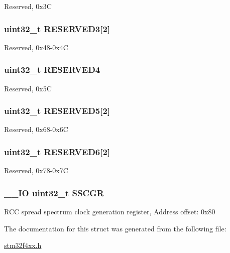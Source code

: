 Reserved, 0x3\-C \hypertarget{struct_r_c_c___type_def_ab6f0f833dbe064708de75d95c68c32fd}{
\subsubsection[{R\-E\-S\-E\-R\-V\-E\-D3}]{\setlength{\rightskip}{0pt plus 5cm}uint32\-\_\-t R\-E\-S\-E\-R\-V\-E\-D3\mbox{[}2\mbox{]}}}\label{struct_r_c_c___type_def_ab6f0f833dbe064708de75d95c68c32fd}
Reserved, 0x48-\/0x4\-C \hypertarget{struct_r_c_c___type_def_ac0018930ee9f18afda25b695b9a4ec16}{
\subsubsection[{R\-E\-S\-E\-R\-V\-E\-D4}]{\setlength{\rightskip}{0pt plus 5cm}uint32\-\_\-t R\-E\-S\-E\-R\-V\-E\-D4}}\label{struct_r_c_c___type_def_ac0018930ee9f18afda25b695b9a4ec16}
Reserved, 0x5\-C \hypertarget{struct_r_c_c___type_def_ac0eb05794aeee3b4ed69c8fe54c9be3b}{
\subsubsection[{R\-E\-S\-E\-R\-V\-E\-D5}]{\setlength{\rightskip}{0pt plus 5cm}uint32\-\_\-t R\-E\-S\-E\-R\-V\-E\-D5\mbox{[}2\mbox{]}}}\label{struct_r_c_c___type_def_ac0eb05794aeee3b4ed69c8fe54c9be3b}
Reserved, 0x68-\/0x6\-C \hypertarget{struct_r_c_c___type_def_a10da398d74a1f88d5b42bd40718d9447}{
\subsubsection[{R\-E\-S\-E\-R\-V\-E\-D6}]{\setlength{\rightskip}{0pt plus 5cm}uint32\-\_\-t R\-E\-S\-E\-R\-V\-E\-D6\mbox{[}2\mbox{]}}}\label{struct_r_c_c___type_def_a10da398d74a1f88d5b42bd40718d9447}
Reserved, 0x78-\/0x7\-C \hypertarget{struct_r_c_c___type_def_aaef3da59eaf7c6dfdf9a12fd60ce58a8}{
\subsubsection[{S\-S\-C\-G\-R}]{\setlength{\rightskip}{0pt plus 5cm}\-\_\-\-\_\-\-I\-O uint32\-\_\-t S\-S\-C\-G\-R}}\label{struct_r_c_c___type_def_aaef3da59eaf7c6dfdf9a12fd60ce58a8}
R\-C\-C spread spectrum clock generation register, Address offset\-: 0x80 

The documentation for this struct was generated from the following file\-:\begin{DoxyCompactItemize}
\item 
\hyperlink{stm32f4xx_8h}{stm32f4xx.\-h}\end{DoxyCompactItemize}
